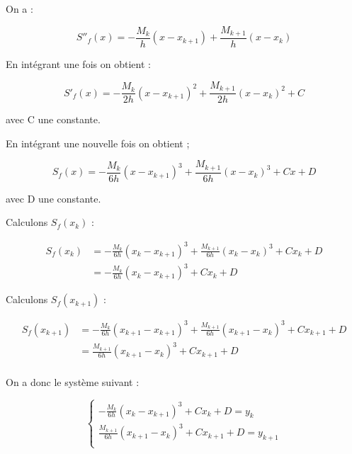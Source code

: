 \documentclass[12pt, letterpaper]{article}
\begin{document}
\begin{enumerate}
\begin{enumerate}
    On a :

    \begin{equation*}
        S''_f(x) = - \frac{M_k}{h} (x - x_{k + 1}) + 
        \frac{M_{k + 1}}{h} (x - x_k)
    \end{equation*}

    En intégrant une fois on obtient :

    \begin{equation*}
      S'_f(x) = - \frac{M_k}{2h} (x - x_{k + 1})^2 + 
      \frac{M_{k + 1}}{2h} (x - x_k)^2 + C
    \end{equation*}

    avec C une constante. \newline

    En intégrant une nouvelle fois on obtient ;

    \begin{equation*}
        S_f(x) = - \frac{M_k}{6h} (x - x_{k + 1})^3 + 
        \frac{M_{k + 1}}{6h} (x - x_k)^3 + Cx + D
    \end{equation*}

    avec D une constante. \newline

    Calculons $S_f(x_k)$ :

    \begin{equation*}
      \begin{split}
        S_f(x_k) & = - \frac{M_k}{6h} (x_k - x_{k + 1})^3 + 
        \frac{M_{k + 1}}{6h} (x_k - x_k)^3 + Cx_k + D \\
        & = - \frac{M_k}{6h} (x_k - x_{k + 1})^3 + Cx_k + D
      \end{split}
    \end{equation*}

    Calculons $S_f(x_{k + 1})$ :

    \begin{equation*}
      \begin{split}
        S_f(x_{k + 1}) & = - \frac{M_k}{6h} (x_{k + 1} - x_{k + 1})^3 + 
        \frac{M_{k + 1}}{6h} (x_{k + 1} - x_k)^3 + Cx_{k + 1} + D \\
        & = \frac{M_{k + 1}}{6h} (x_{k + 1} - x_k)^3 + Cx_{k + 1} + D \\
      \end{split}
    \end{equation*}

    On a donc le système suivant :

    \begin{equation*}
      \left\{
      \begin{array}{l}
        - \frac{M_k}{6h} (x_k - x_{k + 1})^3 + Cx_k + D = y_k \\
        \frac{M_{k + 1}}{6h} (x_{k + 1} - x_k)^3 + Cx_{k + 1} + D =
        y_{k + 1}\\
      \end{array}
      \right.
    \end{equation*}


\end{enumerate}
\end{enumerate}
\end{document}
